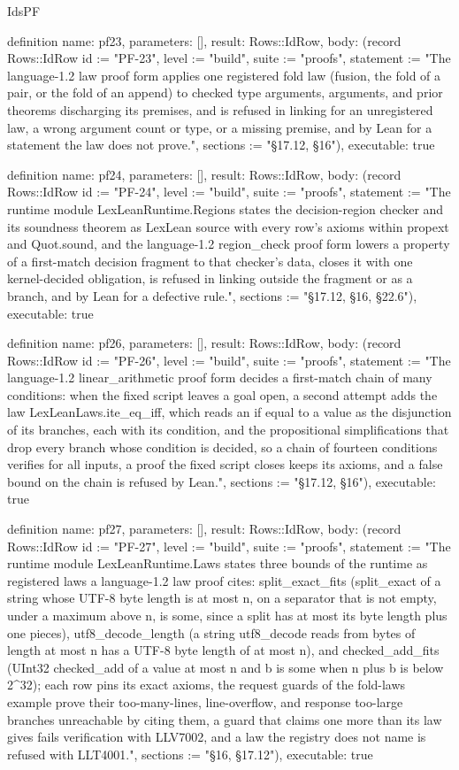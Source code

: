\begin{lexlean}{IdsPF}
\begin{semanticmodule}
definition{
  name: pf23,
  parameters: [],
  result: Rows::IdRow,
  body: (record Rows::IdRow {id := "PF-23", level := "build", suite := "proofs", statement := "The language-1.2 law proof form applies one registered fold law (fusion, the fold of a pair, or the fold of an append) to checked type arguments, arguments, and prior theorems discharging its premises, and is refused in linking for an unregistered law, a wrong argument count or type, or a missing premise, and by Lean for a statement the law does not prove.", sections := "§17.12, §16"}),
  executable: true
}

definition{
  name: pf24,
  parameters: [],
  result: Rows::IdRow,
  body: (record Rows::IdRow {id := "PF-24", level := "build", suite := "proofs", statement := "The runtime module LexLeanRuntime.Regions states the decision-region checker and its soundness theorem as LexLean source with every row's axioms within propext and Quot.sound, and the language-1.2 region_check proof form lowers a property of a first-match decision fragment to that checker's data, closes it with one kernel-decided obligation, is refused in linking outside the fragment or as a branch, and by Lean for a defective rule.", sections := "§17.12, §16, §22.6"}),
  executable: true
}

definition{
  name: pf26,
  parameters: [],
  result: Rows::IdRow,
  body: (record Rows::IdRow {id := "PF-26", level := "build", suite := "proofs", statement := "The language-1.2 linear_arithmetic proof form decides a first-match chain of many conditions: when the fixed script leaves a goal open, a second attempt adds the law LexLeanLaws.ite_eq_iff, which reads an if equal to a value as the disjunction of its branches, each with its condition, and the propositional simplifications that drop every branch whose condition is decided, so a chain of fourteen conditions verifies for all inputs, a proof the fixed script closes keeps its axioms, and a false bound on the chain is refused by Lean.", sections := "§17.12, §16"}),
  executable: true
}

definition{
  name: pf27,
  parameters: [],
  result: Rows::IdRow,
  body: (record Rows::IdRow {id := "PF-27", level := "build", suite := "proofs", statement := "The runtime module LexLeanRuntime.Laws states three bounds of the runtime as registered laws a language-1.2 law proof cites: split_exact_fits (split_exact of a string whose UTF-8 byte length is at most n, on a separator that is not empty, under a maximum above n, is some, since a split has at most its byte length plus one pieces), utf8_decode_length (a string utf8_decode reads from bytes of length at most n has a UTF-8 byte length of at most n), and checked_add_fits (UInt32 checked_add of a value at most n and b is some when n plus b is below 2^32); each row pins its exact axioms, the request guards of the fold-laws example prove their too-many-lines, line-overflow, and response too-large branches unreachable by citing them, a guard that claims one more than its law gives fails verification with LLV7002, and a law the registry does not name is refused with LLT4001.", sections := "§16, §17.12"}),
  executable: true
}


\end{semanticmodule}
\end{lexlean}
